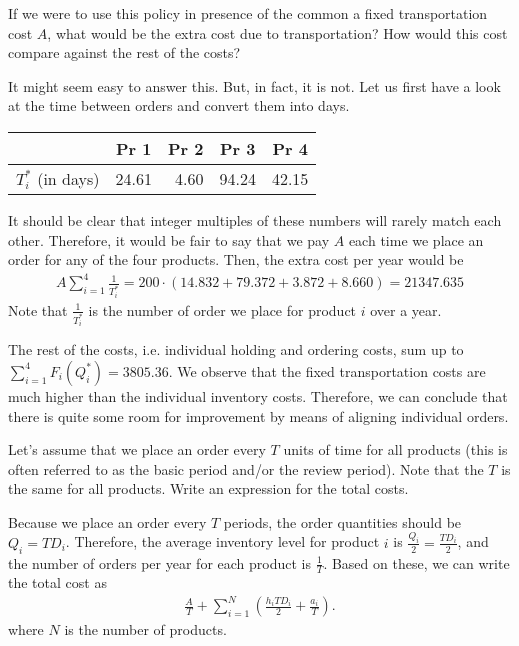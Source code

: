 \begin{exercise}
If we were to use this policy in presence of the common a fixed transportation cost $A$, what would be the extra cost due to transportation? How would this cost compare against the rest of the costs?


\begin{solution}
It might seem easy to answer this. But, in fact, it is not. Let us first have a look at the time between orders and convert them into days. 
\begin{center}
    \begin{tabular}{r|rrrr}
          			& \multicolumn{1}{c}{Pr 1} & \multicolumn{1}{c}{Pr 2} & \multicolumn{1}{c}{Pr 3} & \multicolumn{1}{c}{Pr 4} \\
    \toprule
    $T^*_i$ (in days) 		& 24.61 & 4.60 & 94.24 & 42.15 \\
    \bottomrule
    \end{tabular}%
\end{center}

It should be clear that integer multiples of these numbers will rarely match each other. Therefore, it would be fair to say that we pay $A$ each time we place an order for any of the four products. Then, the extra cost per year would be 
\begin{align*}
A \sum_{i=1}^4 \frac{1}{T^*_i} = 200 \cdot (14.832+79.372+3.872+8.660) = 21347.635
\end{align*}
Note that $\frac{1}{T^*_i}$ is the number of order we place for product $i$ over a year.

The rest of the costs, i.e. individual holding and ordering costs, sum up to $\sum_{i=1}^4 F_i(Q^*_i)=3805.36$. We observe that the fixed transportation costs are much higher than the individual inventory costs. Therefore, we can conclude that there is quite some room for improvement by means of aligning individual orders.
\end{solution}
\end{exercise}

\begin{exercise}
Let's assume that we place an order every $T$ units of time for all products (this is often referred to as the basic period and/or the review period). Note that the $T$ is the same for all products. Write an expression for the total costs. 


\begin{solution}
Because we place an order every $T$ periods, the order quantities should be $Q_i = T D_i$. Therefore, the average inventory level for product $i$ is $\frac{Q_i}{2}=\frac{T D_i}{2}$, and the number of orders per year for each product is $\frac{1}{T}$. Based on these, we can write the total cost as
\begin{align*}
\frac{A}{T} + \sum_{i=1}^N \left(\frac{h_i T D_i}{2} + \frac{a_i}{T}\right).
\end{align*}
where $N$ is the number of products.
\end{solution}
\end{exercise}

